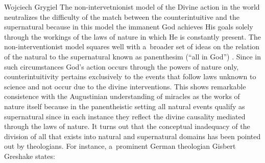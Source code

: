 \begin{artengenv}{Wojciech Grygiel}
The non-intervetnionist model of the Divine action in the world neutralizes the difficulty of the match between the counterintuitive and the supernatural because in this model the immanent God achieves His goals solely through the workings of the laws of nature in which He is constantly present. The non-interventionist model squares well with a~broader set of ideas on the relation of the natural to the supernatural known as panenthesim (``all in God'')
\parencite[e.g.][]{peacocke_articulating_2004}. %
 Since in such circumstances God’s action occurs through the powers of nature only, counterintuitivity pertains exclusively to the events that follow laws unknown to science and not occur due to the divine interventions. This shows remarkable consistence with the Augustinian understanding of miracles as the works of nature itself because in the panentheistic setting all natural events qualify as supernatural since in each instance they reflect the divine causality mediated through the laws of nature. It turns out that the conceptual inadequacy of the division of all that exists into natural and supernatural domains has been pointed out by theologians. For instance, a~prominent German theologian Gisbert Greshake 
\parencite*[][p.37]{greshake_dreieine_1997} %
 states:

\end{artengenv}
